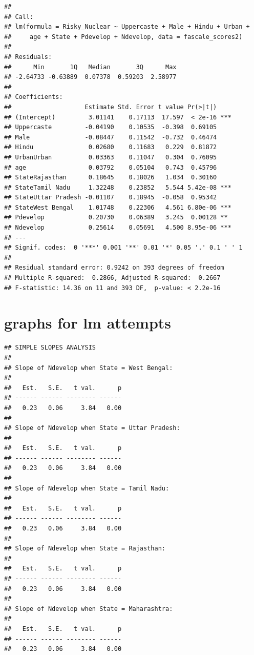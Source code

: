 \documentclass[
]{article}
\begin{document}
\begin{verbatim}
## 
## Call:
## lm(formula = Risky_Nuclear ~ Uppercaste + Male + Hindu + Urban + 
##     age + State + Pdevelop + Ndevelop, data = fascale_scores2)
## 
## Residuals:
##      Min       1Q   Median       3Q      Max 
## -2.64733 -0.63889  0.07378  0.59203  2.58977 
## 
## Coefficients:
##                    Estimate Std. Error t value Pr(>|t|)    
## (Intercept)         3.01141    0.17113  17.597  < 2e-16 ***
## Uppercaste         -0.04190    0.10535  -0.398  0.69105    
## Male               -0.08447    0.11542  -0.732  0.46474    
## Hindu               0.02680    0.11683   0.229  0.81872    
## UrbanUrban          0.03363    0.11047   0.304  0.76095    
## age                 0.03792    0.05104   0.743  0.45796    
## StateRajasthan      0.18645    0.18026   1.034  0.30160    
## StateTamil Nadu     1.32248    0.23852   5.544 5.42e-08 ***
## StateUttar Pradesh -0.01107    0.18945  -0.058  0.95342    
## StateWest Bengal    1.01748    0.22306   4.561 6.80e-06 ***
## Pdevelop            0.20730    0.06389   3.245  0.00128 ** 
## Ndevelop            0.25614    0.05691   4.500 8.95e-06 ***
## ---
## Signif. codes:  0 '***' 0.001 '**' 0.01 '*' 0.05 '.' 0.1 ' ' 1
## 
## Residual standard error: 0.9242 on 393 degrees of freedom
## Multiple R-squared:  0.2866, Adjusted R-squared:  0.2667 
## F-statistic: 14.36 on 11 and 393 DF,  p-value: < 2.2e-16
\end{verbatim}

\hypertarget{graphs-for-lm-attempts}{%
\section{graphs for lm attempts}\label{graphs-for-lm-attempts}}

\begin{verbatim}
## SIMPLE SLOPES ANALYSIS 
## 
## Slope of Ndevelop when State = West Bengal: 
## 
##   Est.   S.E.   t val.      p
## ------ ------ -------- ------
##   0.23   0.06     3.84   0.00
## 
## Slope of Ndevelop when State = Uttar Pradesh: 
## 
##   Est.   S.E.   t val.      p
## ------ ------ -------- ------
##   0.23   0.06     3.84   0.00
## 
## Slope of Ndevelop when State = Tamil Nadu: 
## 
##   Est.   S.E.   t val.      p
## ------ ------ -------- ------
##   0.23   0.06     3.84   0.00
## 
## Slope of Ndevelop when State = Rajasthan: 
## 
##   Est.   S.E.   t val.      p
## ------ ------ -------- ------
##   0.23   0.06     3.84   0.00
## 
## Slope of Ndevelop when State = Maharashtra: 
## 
##   Est.   S.E.   t val.      p
## ------ ------ -------- ------
##   0.23   0.06     3.84   0.00
\end{verbatim}
\end{document}
